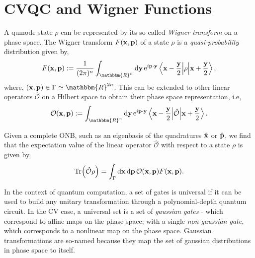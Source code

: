 \documentclass[11pt,oneside]{article}
\theoremstyle{definition}
\theoremstyle{definition}
\newcommand{\R}{\mathbbm{R}}
\newcommand{\e}{\mathrm{e}}
\newcommand{\vxop}{\hat{\vb{x}}}
\newcommand{\vpop}{\hat{\vb{p}}}
\begin{document}
\section{CVQC and Wigner Functions}

A qumode state $\rho$ can be represented by its so-called \textit{Wigner transform} on a phase space. The Wigner transform $F(\vb{x}, \vb{p})$ of a state $\rho$ is a \textit{quasi-probability} distribution given by,
\begin{equation}
    F(\vb{x}, \vb{p}) := \frac{1}{(2 \pi)^n} \int_{\R^n} \dd \vb{y} \, \e^{i\vb{p} \cdot \vb{y}} \mel{\vb{x} - \frac{\vb{y}}{2}}{\rho}{\vb{x} + \frac{\vb{y}}{2}},
\end{equation}
where, $(\vb{x}, \vb{p}) \in \Gamma \simeq \R^{2n}$. This can be extended to other linear operators $\hat{\mathcal{O}}$ on a Hilbert space to obtain their phase space representation, i.e,
\begin{equation}
    \mathcal{O}(\vb{x}, \vb{p}) := \int_{\R^n} \dd \vb{y} \, \e^{i\vb{p} \cdot \vb{y}} \mel{\vb{x} - \frac{\vb{y}}{2}}{\hat{\mathcal{O}}}{\vb{x} + \frac{\vb{y}}{2}}.
\end{equation}

Given a complete ONB, such as an eigenbasis of the quadratures $\vxop$ or $\vpop$, we find that the expectation value of the linear operator $\mathcal{\hat{O}}$ with respect to a state $\rho$ is given by,
\begin{equation}
    \Tr (\mathcal{\hat{O}} \rho) = \int_{\Gamma} \dd \vb{x} \, \dd \vb{p} \, \mathcal{O}(\vb{x}, \vb{p}) F(\vb{x}, \vb{p}).
\end{equation}

In the context of quantum computation, a set of gates is universal if it can be used to build any unitary transformation through a polynomial-depth quantum circuit. In the CV case, a universal set is a set of \textit{gaussian gates} - which correspond to affine maps on the phase space; with a single \textit{non-gaussian gate}, which corresponds to a nonlinear map on the phase space. Gaussian transformations are so-named because they map the set of gaussian distributions in phase space to itself. \\
\end{document}
